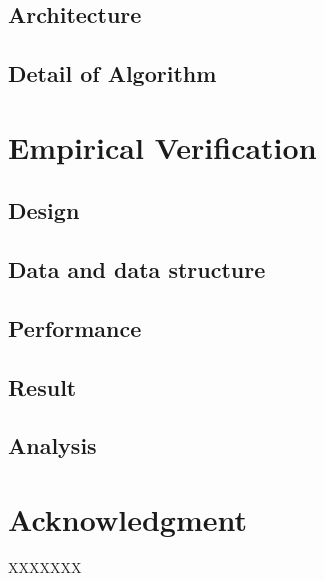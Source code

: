 \documentclass[conference,compsoc]{IEEEtran}
\begin{document}
\subsection{Architecture}


\subsection{Detail of Algorithm}


\section{Empirical Verification}


\subsection{Design}

\subsection{Data and data structure}

\subsection{Performance}

\subsection{Result}

\subsection{Analysis}



\section*{Acknowledgment}



\begin{thebibliography}{1}
 XXXXXXX
\end{thebibliography}
\end{document}
